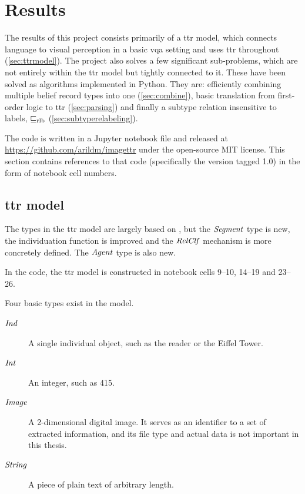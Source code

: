 \renewcommand{\sectionautorefname}{Section}
\let\subsectionautorefname\sectionautorefname
\let\subsubsectionautorefname\sectionautorefname
\section{Results}
\label{sec:results}

The results of this project consists primarily of a \gls{ttr} model, which connects language to visual perception in a basic \gls{vqa} setting and uses \gls{ttr} throughout (\autoref{sec:ttrmodel}).
The project also solves a few significant sub-problems, which are not entirely within the \gls{ttr} model but tightly connected to it.
These have been solved as algorithms implemented in Python.
They are: efficiently combining multiple belief record types into one (\autoref{sec:combine}), basic translation from first-order logic to \gls{ttr} (\autoref{sec:parsing}) and finally a subtype relation insensitive to labels, $\mathrel{\sqsubseteq_\text{rlb}}$ (\autoref{sec:subtyperelabeling}).

The code is written in a Jupyter notebook file and released at \url{https://github.com/arildm/imagettr} under the open-source MIT license.
This section contains references to that code (specifically the version tagged 1.0) in the form of notebook cell numbers.



\subsection{\Gls{ttr} model}
\label{sec:ttrmodel}

The types in the \gls{ttr} model are largely based on \cite{lspc}, but the $\mathit{Segment}$ type is new, the individuation function is improved and the $\mathit{RelClf}$ mechanism is more concretely defined.
The $\mathit{Agent}$ type is also new.

In the code, the \gls{ttr} model is constructed in notebook cells 9–10, 14–19 and 23–26.

Four basic types exist in the model.

\begin{description}
\item [$\mathit{Ind}$] A single individual object, such as the reader or the Eiffel Tower.
\item [$\mathit{Int}$] An integer, such as 415.
\item [$\mathit{Image}$] A 2-dimensional digital image.
It serves as an identifier to a set of extracted information, and its file type and actual data is not important in this thesis.
\item [$\mathit{String}$] A piece of plain text of arbitrary length.
\end{description}

